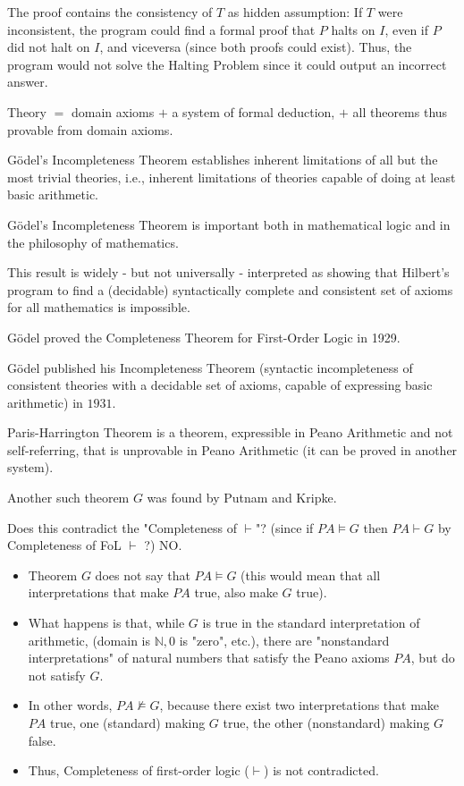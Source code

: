 \documentclass{article}
\begin{document}
The proof contains the consistency of $T$ as hidden assumption: If $T$ were inconsistent, the program could find a formal proof that $P$ halts on $I$, even if $P$ did not halt on $I$, and viceversa (since both proofs could exist). Thus, the program would not solve the Halting Problem since it could output an incorrect answer.

Theory $=$ domain axioms $+$ a system of formal deduction, $+$ all theorems thus provable from domain axioms.

Gödel's Incompleteness Theorem establishes inherent limitations of all but the most trivial theories, i.e., inherent limitations of theories capable of doing at least basic arithmetic.

Gödel's Incompleteness Theorem is important both in mathematical logic and in the philosophy of mathematics.

This result is widely - but not universally - interpreted as showing that Hilbert's program to find a (decidable) syntactically complete and consistent set of axioms for all mathematics is impossible.

Gödel proved the Completeness Theorem for First-Order Logic in 1929. 

Gödel published his Incompleteness Theorem (syntactic incompleteness of consistent theories with a decidable set of axioms, capable of expressing basic arithmetic) in $1931$. 

Paris-Harrington Theorem is a theorem, expressible in Peano Arithmetic and not self-referring, that is unprovable in Peano Arithmetic (it can be proved in another system).

Another such theorem $G$ was found by Putnam and Kripke. 

Does this contradict the "Completeness of $\vdash$"? (since if $PA \vDash G$ then $PA \vdash G$ by Completeness of FoL $\vdash$ ?) NO.
\begin{itemize}
    \item Theorem $G$ does not say that $PA \vDash G$ (this would mean that all interpretations that make $PA$ true, also make $G$ true).
    \item What happens is that, while $G$ is true in the standard interpretation of arithmetic, (domain is $\mathbb{N}, 0$ is "zero", etc.), there are "nonstandard interpretations" of natural numbers that satisfy the Peano axioms $PA$, but do not satisfy $G$.
    \item In other words, $PA \not\vDash G$, because there exist two interpretations that make $PA$ true, one (standard) making $G$ true, the other (nonstandard) making $G$ false.
    \item Thus, Completeness of first-order logic ($\vdash$) is not contradicted.
\end{itemize}
\end{document}

